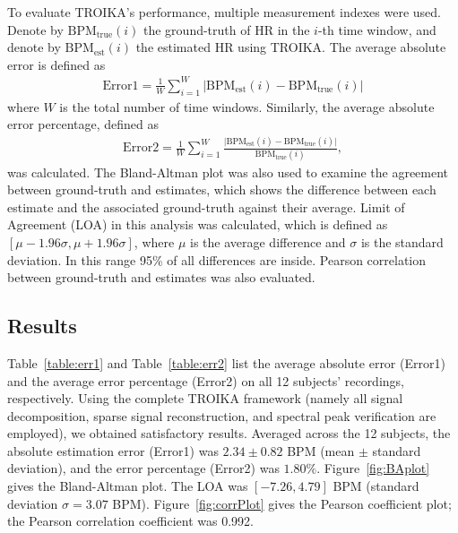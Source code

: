 \documentclass[10pt,twocolumn]{IEEEtran}
\begin{document}
To evaluate TROIKA's performance, multiple measurement indexes were used.
Denote by $\mathrm{BPM}_\mathrm{true}(i)$ the ground-truth of HR in the $i$-th time window, and denote by $\mathrm{BPM}_\mathrm{est}(i)$ the estimated HR using TROIKA. The average absolute  error is defined as
\begin{eqnarray}
\mathrm{Error1} = \frac{1}{W} \sum_{i=1}^W \big|\mathrm{BPM}_\mathrm{est}(i) -  \mathrm{BPM}_\mathrm{true}(i) \big|
\end{eqnarray}
where $W$ is the total number of time windows.  Similarly, the average absolute error percentage, defined as
\begin{eqnarray}
\mathrm{Error2} = \frac{1}{W} \sum_{i=1}^W \frac{\big|\mathrm{BPM}_\mathrm{est}(i) -  \mathrm{BPM}_\mathrm{true}(i) \big|}{\mathrm{BPM}_\mathrm{true}(i) },
\end{eqnarray}
was calculated. The Bland-Altman plot \cite{martin1986statistical} was also used to examine the agreement between ground-truth and estimates, which shows the difference between  each estimate and the associated ground-truth against their average. Limit of Agreement (LOA) in this analysis was calculated, which is defined as $[\mu-1.96\sigma,\mu+1.96\sigma]$, where $\mu$ is the average difference and $\sigma$ is the standard deviation. In this range 95\% of all differences are inside. Pearson correlation between  ground-truth and  estimates was also evaluated.








\subsection{Results}

Table~\ref{table:err1} and Table~\ref{table:err2} list the average absolute error (Error1) and the average error percentage (Error2) on all 12 subjects' recordings, respectively. Using the complete TROIKA framework (namely all signal decomposition, sparse signal reconstruction, and spectral peak verification are employed), we obtained satisfactory results. Averaged across the 12 subjects, the absolute estimation error (Error1) was $2.34 \pm 0.82$ BPM (mean $\pm$ standard deviation), and the error percentage (Error2) was $1.80\%$. Figure~\ref{fig:BAplot} gives the Bland-Altman plot. The LOA was $[-7.26, 4.79]$ BPM (standard deviation $\sigma=3.07$ BPM). Figure~\ref{fig:corrPlot} gives the Pearson coefficient plot; the Pearson correlation coefficient was 0.992.
\end{document}
